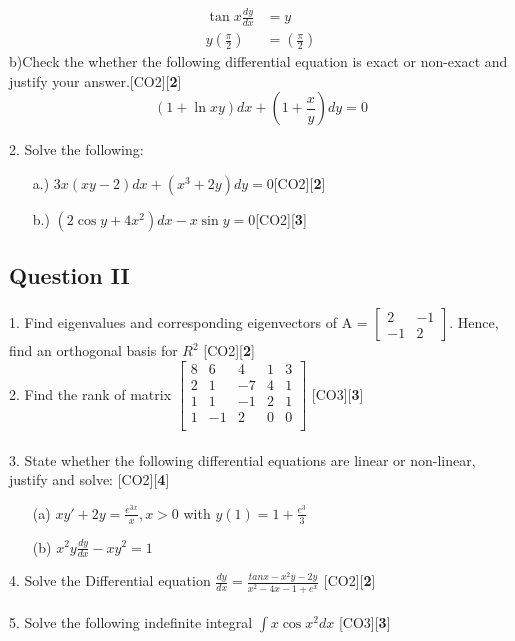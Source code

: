 \documentclass{article}
\begin{document}
	\begin{align*}
	\tan x\frac{dy}{dx}&=y
	\\y(\frac{\pi}{2})&=(\frac{\pi}{2})
	\end{align*} 
\noindent b)Check the whether the following differential equation is exact or non-exact and justify your answer.\hfill [CO2][{\bf 2}]
	 \begin{equation*}
	 (1 + \ln xy)dx + (1 + \frac{x}{y})dy = 0
	\end{equation*}

2. Solve the following:
\begin{itemize}
 \item[a.)] $ 3x(xy - 2)dx + (x^3 + 2y)dy = 0 $\hfill [CO2][{\bf 2}]
 \item[b.)] $ (2\cos y +4x^2)dx - x \sin y = 0$\hfill [CO2][{\bf 3}]
\end{itemize}
\pagebreak
\vspace{-10 cm}
\subsection*{Question II}
1. Find eigenvalues and corresponding eigenvectors of A = 
	$\begin{bmatrix}
	2 & -1 \\ -1 & 2
	\end{bmatrix}$. Hence, find an orthogonal basis for $R^2$
	\hfill [CO2][{\bf 2}]\\
2. Find the rank of matrix
	$\begin{bmatrix}
	8 & 6 & 4 & 1 & 3\\
	2 & 1 & -7 & 4 & 1\\	
	1 & 1 & -1 & 2 & 1\\
	1 & -1 & 2 & 0 & 0\\
	\end{bmatrix}$ 
	\hfill [CO3][{\bf 3}]\\\\
3. State whether the following differential equations are linear or non-linear, justify and solve:  \hfill [CO2][{\bf 4}]\\
	\begin{itemize}
	\item[(a)] $ xy' + 2y = \frac{e^{3x}}{x}, x>0$ with $y(1)=1+\frac{e^3}{3}$
	\item[(b)] $x^2y\frac{dy}{dx}-xy^2=1$
	\end{itemize}
4. Solve the Differential equation 
$\frac{dy}{dx} = \frac{tanx-x^2y-2y}{x^2-4x-1+e^x}$ \hfill [CO2][{\bf 2}] \\\\
5. Solve the following indefinite integral
$\int x \cos{x^2} dx$  \hfill [CO3][{\bf 3}]\\
\end{document}
